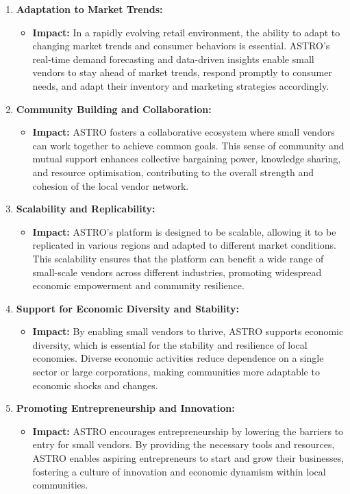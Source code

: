\begin{enumerate}
	\item \textbf{Adaptation to Market Trends:}
	      \begin{itemize}
		      \item \textbf{Impact:} In a rapidly evolving retail environment, the ability to adapt to changing market trends and consumer behaviors is essential. ASTRO’s real-time demand forecasting and data-driven insights enable small vendors to stay ahead of market trends, respond promptly to consumer needs, and adapt their inventory and marketing strategies accordingly.
	      \end{itemize}

	\item \textbf{Community Building and Collaboration:}
	      \begin{itemize}
		      \item \textbf{Impact:} ASTRO fosters a collaborative ecosystem where small vendors can work together to achieve common goals. This sense of community and mutual support enhances collective bargaining power, knowledge sharing, and resource optimisation, contributing to the overall strength and cohesion of the local vendor network.
	      \end{itemize}

	\item \textbf{Scalability and Replicability:}
	      \begin{itemize}
		      \item \textbf{Impact:} ASTRO’s platform is designed to be scalable, allowing it to be replicated in various regions and adapted to different market conditions. This scalability ensures that the platform can benefit a wide range of small-scale vendors across different industries, promoting widespread economic empowerment and community resilience.
	      \end{itemize}

	\item \textbf{Support for Economic Diversity and Stability:}
	      \begin{itemize}
		      \item \textbf{Impact:} By enabling small vendors to thrive, ASTRO supports economic diversity, which is essential for the stability and resilience of local economies. Diverse economic activities reduce dependence on a single sector or large corporations, making communities more adaptable to economic shocks and changes.
	      \end{itemize}

	\item \textbf{Promoting Entrepreneurship and Innovation:}
	      \begin{itemize}
		      \item \textbf{Impact:} ASTRO encourages entrepreneurship by lowering the barriers to entry for small vendors. By providing the necessary tools and resources, ASTRO enables aspiring entrepreneurs to start and grow their businesses, fostering a culture of innovation and economic dynamism within local communities.
	      \end{itemize}


\end{enumerate}
